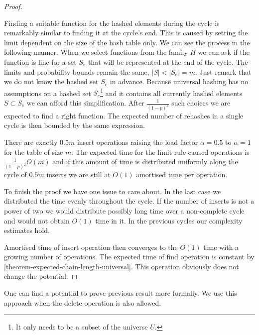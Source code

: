 \begin{proof}
\begin{itemize}
Finding a suitable function for the hashed elements during the cycle is remarkably similar to finding it at the cycle's end. This is caused by setting the limit dependent on the size of the hash table only. We can see the process in the following manner. When we select functions from the family $H$ we can ask if the function is fine for a set $S_e$ that will be represented at the end of the cycle. The limits and probability bounds remain the same, $|S| < |S_e| = m$. Just remark that we do not know the hashed set $S_e$ in advance. Because universal hashing has no assumptions on a hashed set $S_e$\footnote{It only needs to be a subset of the universe $U$.} and it contains all currently hashed elements $S \subset S_e$ we can afford this simplification. After $\frac{1}{(1-p)^2}$ such choices we are expected to find a right function. The expected number of rehashes in a single cycle is then bounded by the same expression. 

There are exactly $0.5 m$ insert operations raising the load factor $\alpha = 0.5$ to $\alpha = 1$ for the table of size $m$. The expected time for the limit rule caused operations is $\frac{1}{(1 - p)^2}O(m)$ and if this amount of time is distributed uniformly along the cycle of $0.5 m$ inserts we are still at $O(1)$ amortised time per operation.
\end{itemize}

To finish the proof we have one issue to care about. In the last case we distributed the time evenly throughout the cycle. If the number of inserts is not a power of two we would distribute possibly long time over a non-complete cycle and would not obtain $O(1)$ time in it. In the previous cycles our complexity estimates hold. 

Amortised time of insert operation then converges to the $O(1)$ time with a growing number of operations. The expected time of find operation is constant by \ref{theorem-expected-chain-length-universal}. This operation obviously does not change the potential.
\end{proof}

One can find a potential to prove previous result more formally. We use this approach when the delete operation is also allowed.

